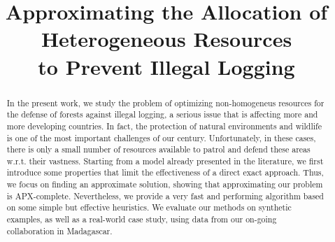 \documentclass{llncs}
\title{Approximating the Allocation of Heterogeneous Resources\\to Prevent Illegal Logging}
\begin{document}
\maketitle

\begin{abstract}
In the present work, we study the problem of optimizing non-homogeneus resources for the defense of forests against illegal logging, a serious issue that is affecting more and more developing countries. In fact, the protection of natural environments and wildlife is one of the most important challenges of our century. Unfortunately, in these cases, there is only a small number of resources available to patrol and defend these areas w.r.t. their vastness. Starting from a model already presented in the literature, we first introduce some properties that limit the effectiveness of a direct exact approach. Thus, we focus on finding an approximate solution, showing that approximating our problem is \textsf{APX}-complete. Nevertheless, we provide a very fast and performing algorithm based on some simple but effective heuristics. We evaluate our methods on synthetic examples, as well as a real-world case study, using data from our on-going collaboration in Madagascar.
\end{abstract}








\newpage



\end{document}
